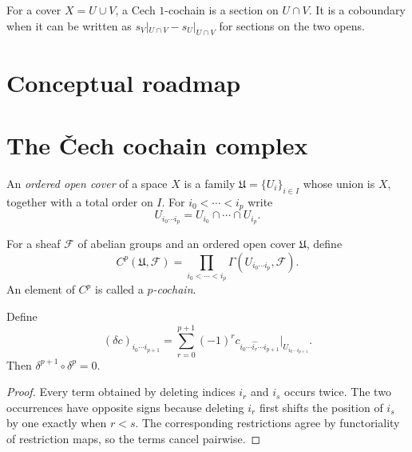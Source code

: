 \begin{example}\label{ex:vi47-expand-01}
For a cover $X=U\cup V$, a Cech $1$-cochain is a section on $U\cap V$.  It is a coboundary when it can be written as $s_V|_{U\cap V}-s_U|_{U\cap V}$ for sections on the two opens.
\end{example}
\section*{Conceptual roadmap}


\section{The \v{C}ech cochain complex}
\begin{definition}\label{def:vi47-cover}
An \emph{ordered open cover} of a space $X$ is a family $\mathfrak U=\{U_i\}_{i\in I}$ whose union is $X$, together with a total order on $I$.  For $i_0<\cdots<i_p$ write
\[
U_{i_0\cdots i_p}=U_{i_0}\cap\cdots\cap U_{i_p}.
\]
\end{definition}

\begin{definition}\label{def:vi47-cochains}
For a sheaf $\mathcal F$ of abelian groups and an ordered open cover $\mathfrak U$, define
\[
C^p(\mathfrak U,\mathcal F)
=
\prod_{i_0<\cdots<i_p}\Gamma(U_{i_0\cdots i_p},\mathcal F).
\]
An element of $C^p$ is called a \emph{$p$-cochain}.
\end{definition}


\begin{proposition}[The alternating differential satisfies $\delta^2=0$]\label{prop:vi47-delta-square}
Define
\[
(\delta c)_{i_0\cdots i_{p+1}}
=
\sum_{r=0}^{p+1}(-1)^r
c_{i_0\cdots\widehat{i_r}\cdots i_{p+1}}
\big|_{U_{i_0\cdots i_{p+1}}}.
\]
Then $\delta^{p+1}\circ\delta^p=0$.
\begin{proof}
Every term obtained by deleting indices $i_r$ and $i_s$ occurs twice.  The two occurrences have opposite signs because deleting $i_r$ first shifts the position of $i_s$ by one exactly when $r<s$.  The corresponding restrictions agree by functoriality of restriction maps, so the terms cancel pairwise.
\end{proof}
\end{proposition}

